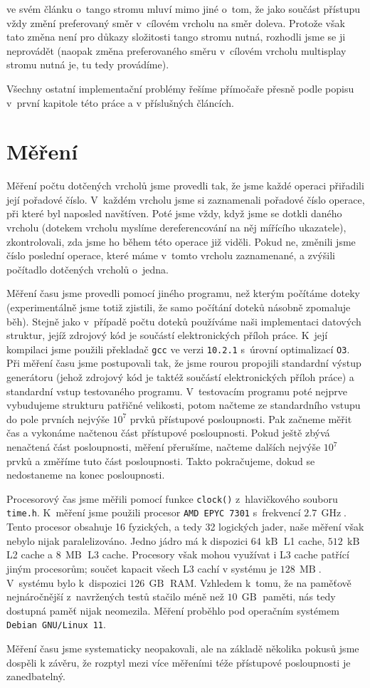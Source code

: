 \citet{tango} ve svém článku o~tango stromu mluví mimo jiné o~tom, že jako
součást přístupu vždy změní preferovaný směr v~cílovém vrcholu na směr doleva.
Protože však tato změna není pro důkazy složitosti tango stromu nutná, rozhodli
jsme se ji neprovádět (naopak změna preferovaného směru v~cílovém vrcholu
multisplay stromu nutná je, tu tedy provádíme).

Všechny ostatní implementační problémy řešíme přímočaře přesně podle popisu
v~první kapitole této práce a v příslušných článcích.

\section{Měření}

Měření počtu dotčených vrcholů jsme provedli tak, že jsme každé operaci 
přiřadili její pořadové číslo. V~každém vrcholu jsme si zaznamenali pořadové číslo
operace, při které byl naposled navštíven. Poté jsme vždy, když jsme se dotkli daného
vrcholu (dotekem vrcholu myslíme dereferencování na něj mířícího ukazatele),
zkontrolovali, zda jsme ho během této operace již viděli. Pokud ne, změnili jsme
číslo poslední operace, které máme v~tomto vrcholu zaznamenané, a zvýšili
počítadlo dotčených vrcholů o~jedna.

Měření času jsme provedli pomocí jiného programu, než kterým počítáme doteky
(experimentálně jsme totiž zjistili, že samo počítání doteků násobně zpomaluje
běh). Stejně jako v~případě počtu doteků používáme naši implementaci datových
struktur, jejíž zdrojový kód je součástí elektronických příloh práce. K~její
kompilaci jsme použili překladač {\tt gcc} ve verzi {\tt 10.2.1} s~úrovní
optimalizací {\tt O3}. Při měření času jsme postupovali tak, že jsme rourou propojili standardní výstup generátoru (jehož zdrojový kód je
taktéž součástí elektronických příloh práce) a standardní vstup testovaného
programu. V~testovacím programu poté nejprve vybudujeme
strukturu patřičné velikosti, potom načteme ze standardního vstupu do pole
prvních nejvýše $10^7$ prvků přístupové posloupnosti. Pak začneme měřit
čas a vykonáme načtenou část přístupové posloupnosti. Pokud ještě zbývá
nenačtená část posloupnosti, měření přerušíme, načteme dalších nejvýše
$10^7$ prvků a změříme tuto část posloupnosti. Takto pokračujeme, dokud
se nedostaneme na konec posloupnosti.

Procesorový čas jsme měřili pomocí funkce {\tt clock()} z~hlavičkového souboru
{\tt time.h}. K~měření jsme použili procesor {\tt AMD EPYC 7301}
s~frekvencí  $2.7\, \operatorname{GHz}$. Tento procesor obsahuje 16 fyzických, a tedy
32 logických jader, naše měření však nebylo nijak paralelizováno. Jedno jádro má k dispozici $64\,\operatorname{kB}$ L1 cache, $512\,\operatorname{kB}$ L2 cache a $8\,\operatorname{MB}$ L3 cache. Procesory však mohou využívat i L3 cache patřící jiným procesorům; součet kapacit všech L3 cachí v systému je $128\,\operatorname{MB}$. V~systému bylo
k~dispozici $126\,\operatorname{GB}$ RAM. Vzhledem k~tomu, že na paměťově
nejnáročnější z~navržených testů stačilo méně než $10\,\operatorname{GB}$
paměti, nás tedy dostupná paměť nijak neomezila. Měření proběhlo pod operačním
systémem {\tt Debian GNU/Linux 11}.

Měření času jsme systematicky neopakovali, ale na základě několika pokusů jsme dospěli k závěru, že rozptyl mezi více měřeními téže přístupové posloupnosti je zanedbatelný.
